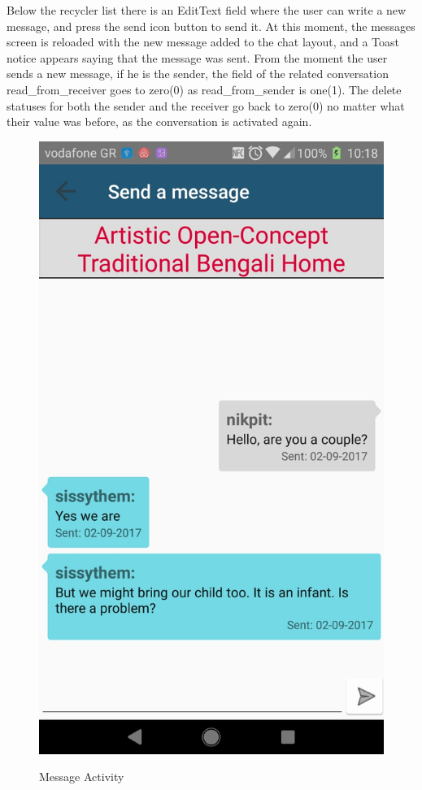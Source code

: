 \documentclass[12pt]{article}
\begin{document}
	Below the recycler list there is an EditText field where the user can write a new message, and press the send icon button to send it. At this moment, the messages screen is reloaded with the new message added to the chat layout, and a Toast notice appears saying that the message was sent. From the moment the user sends a new message, if he is the sender, the field of the related conversation read\_from\_receiver goes to zero(0) as read\_from\_sender is one(1). The delete statuses for both the sender and the receiver go back to zero(0) no matter what their value was before, as the conversation is activated again. 
	
	\begin{figure} [H]
		\begin{center}
			\includegraphics [scale = 0.18] {13-message.jpg}\\[1.0 cm]
			\caption{Message Activity}
		\end{center}
	\end{figure}
	
\end{document}
